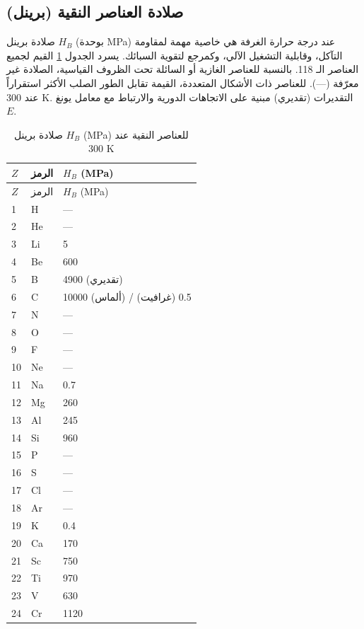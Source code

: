 \documentclass[11pt,a4paper]{article}
\begin{document}
\begin{otherlanguage}{arabic}
		\subsection{صلادة العناصر النقية (برينل)}
		\label{subsec:hardness}
		
		صلادة برينل \(H_B\) (بوحدة MPa) عند درجة حرارة الغرفة هي خاصية مهمة لمقاومة التآكل، وقابلية التشغيل الآلي، وكمرجع لتقوية السبائك. يسرد الجدول \ref{tab:hardness-all} القيم لجميع العناصر الـ 118. بالنسبة للعناصر الغازية أو السائلة تحت الظروف القياسية، الصلادة غير معرّفة (—). للعناصر ذات الأشكال المتعددة، القيمة تقابل الطور الصلب الأكثر استقراراً عند 300 K. التقديرات (تقديري) مبنية على الاتجاهات الدورية والارتباط مع معامل يونغ \(E\).
		
		\begin{longtable}{p{0.6cm}p{1.2cm}p{2.5cm}}
			\caption{صلادة برينل \(H_B\) (MPa) للعناصر النقية عند 300 K} \label{tab:hardness-all} \\
			\toprule
			\(Z\) & الرمز & \(H_B\) (MPa) \\
			\midrule
			\endfirsthead
			\toprule
			\(Z\) & الرمز & \(H_B\) (MPa) \\
			\midrule
			\endhead
			1  & H  & — \\
			2  & He & — \\
			3  & Li & 5 \\
			4  & Be & 600 \\
			5  & B  & 4900 (تقديري) \\
			6  & C  & 10000 (ألماس) / 0.5 (غرافيت) \\
			7  & N  & — \\
			8  & O  & — \\
			9  & F  & — \\
			10 & Ne & — \\
			11 & Na & 0.7 \\
			12 & Mg & 260 \\
			13 & Al & 245 \\
			14 & Si & 960 \\
			15 & P  & — \\
			16 & S  & — \\
			17 & Cl & — \\
			18 & Ar & — \\
			19 & K  & 0.4 \\
			20 & Ca & 170 \\
			21 & Sc & 750 \\
			22 & Ti & 970 \\
			23 & V  & 630 \\
			24 & Cr & 1120 \\

\end{longtable}
\end{otherlanguage}
\end{document}
